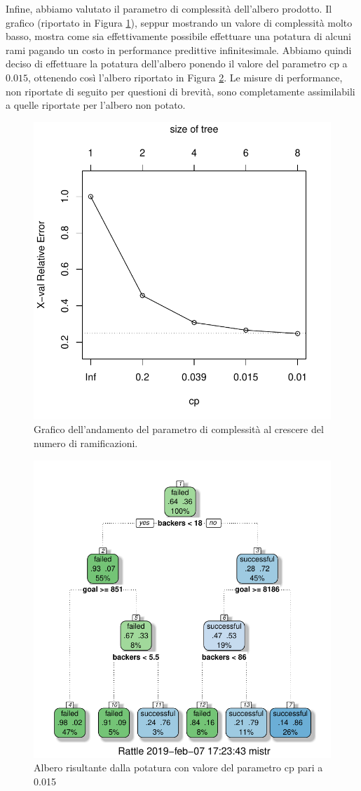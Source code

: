 Infine, abbiamo valutato il parametro di complessità dell'albero prodotto. Il grafico (riportato in Figura \ref{fig:cptree}), seppur mostrando un valore di complessità molto basso, mostra come sia effettivamente possibile effettuare una potatura di alcuni rami pagando un costo in performance predittive infinitesimale. Abbiamo quindi deciso di effettuare la potatura dell'albero ponendo il valore del parametro cp a $0.015$, ottenendo così l'albero riportato in Figura \ref{fig:prunedtree}. Le misure di performance, non riportate di seguito per questioni di brevità, sono completamente assimilabili a quelle riportate per l'albero non potato.
\begin{figure}
	\centering
	\includegraphics[width=0.7\linewidth]{../FinalResults/cptree}
	\caption{Grafico dell'andamento del parametro di complessità al crescere del numero di ramificazioni.}
	\label{fig:cptree}
\end{figure}
\begin{figure}
	\centering
	\includegraphics[width=0.7\linewidth]{../FinalResults/prunedtree}
	\caption{Albero risultante dalla potatura con valore del parametro cp pari a 0.015}
	\label{fig:prunedtree}
\end{figure}

